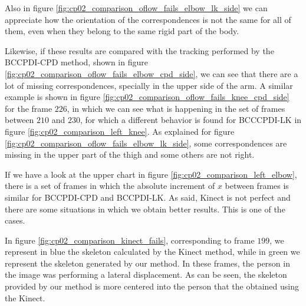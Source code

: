 Also in figure 
\ref{fig:cp02_comparison_oflow_fails_elbow_lk_side} we can appreciate how the 
orientation of the correspondences is not the same for all of them, even when they belong to the same rigid part of the 
body. 

Likewise, if 
these results are compared with the tracking performed by the BCCPDI-CPD method, shown in figure 
\ref{fig:cp02_comparison_oflow_fails_elbow_cpd_side}, we can see that there are a lot of missing correspondences, specially 
in the upper side of the arm. A similar example is shown in figure \ref{fig:cp02_comparison_oflow_fails_knee_cpd_side} for 
the frame $226$, in which we can see what is happening in the set of frames between $210$ and $230$, for which a 
different behavior is found for BCCCPDI-LK in figure \ref{fig:cp02_comparison_left_knee}. As explained for figure 
\ref{fig:cp02_comparison_oflow_fails_elbow_lk_side}, some correspondences are missing in the upper part of the thigh and some 
others are not right.

If we have a look at the upper chart in figure \ref{fig:cp02_comparison_left_elbow}, there is a set of frames in which the 
absolute increment of $x$ between frames is similar for BCCPDI-CPD and BCCPDI-LK. As said, Kinect is not perfect and 
there are some situations in which we obtain better results. This is one of the cases. 

In figure 
\ref{fig:cp02_comparison_kinect_fails}, corresponding to frame $199$, we represent in blue the skeleton calculated by the 
Kinect method, while in green we represent the skeleton generated by our method. In these frames, the person in the 
image was performing a lateral displacement. As can be seen, the skeleton provided by our method is more centered into 
the person that the obtained using the Kinect. 

